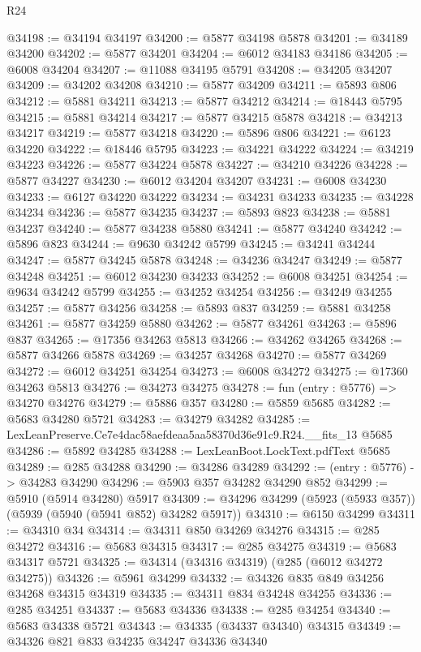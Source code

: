 \begin{lexlean}{R24}
\begin{coremodule}
@34198 := @34194 @34197
@34200 := @5877 @34198 @5878
@34201 := @34189 @34200
@34202 := @5877 @34201
@34204 := @6012 @34183 @34186
@34205 := @6008 @34204
@34207 := @11088 @34195 @5791
@34208 := @34205 @34207
@34209 := @34202 @34208
@34210 := @5877 @34209
@34211 := @5893 @806
@34212 := @5881 @34211
@34213 := @5877 @34212
@34214 := @18443 @5795
@34215 := @5881 @34214
@34217 := @5877 @34215 @5878
@34218 := @34213 @34217
@34219 := @5877 @34218
@34220 := @5896 @806
@34221 := @6123 @34220
@34222 := @18446 @5795
@34223 := @34221 @34222
@34224 := @34219 @34223
@34226 := @5877 @34224 @5878
@34227 := @34210 @34226
@34228 := @5877 @34227
@34230 := @6012 @34204 @34207
@34231 := @6008 @34230
@34233 := @6127 @34220 @34222
@34234 := @34231 @34233
@34235 := @34228 @34234
@34236 := @5877 @34235
@34237 := @5893 @823
@34238 := @5881 @34237
@34240 := @5877 @34238 @5880
@34241 := @5877 @34240
@34242 := @5896 @823
@34244 := @9630 @34242 @5799
@34245 := @34241 @34244
@34247 := @5877 @34245 @5878
@34248 := @34236 @34247
@34249 := @5877 @34248
@34251 := @6012 @34230 @34233
@34252 := @6008 @34251
@34254 := @9634 @34242 @5799
@34255 := @34252 @34254
@34256 := @34249 @34255
@34257 := @5877 @34256
@34258 := @5893 @837
@34259 := @5881 @34258
@34261 := @5877 @34259 @5880
@34262 := @5877 @34261
@34263 := @5896 @837
@34265 := @17356 @34263 @5813
@34266 := @34262 @34265
@34268 := @5877 @34266 @5878
@34269 := @34257 @34268
@34270 := @5877 @34269
@34272 := @6012 @34251 @34254
@34273 := @6008 @34272
@34275 := @17360 @34263 @5813
@34276 := @34273 @34275
@34278 := fun (entry : @5776) => @34270 @34276
@34279 := @5886 @357
@34280 := @5859 @5685
@34282 := @5683 @34280 @5721
@34283 := @34279 @34282
@34285 := LexLeanPreserve.Ce7e4dac58aefdeaa5aa58370d36e91c9.R24.__fits_13 @5685
@34286 := @5892 @34285
@34288 := LexLeanBoot.LockText.pdfText @5685
@34289 := @285 @34288
@34290 := @34286 @34289
@34292 := (entry : @5776) -> @34283 @34290
@34296 := @5903 @357 @34282 @34290 @852
@34299 := @5910 (@5914 @34280) @5917
@34309 := @34296 @34299 (@5923 (@5933 @357)) (@5939 (@5940 (@5941 @852) @34282 @5917))
@34310 := @6150 @34299
@34311 := @34310 @34
@34314 := @34311 @850 @34269 @34276
@34315 := @285 @34272
@34316 := @5683 @34315
@34317 := @285 @34275
@34319 := @5683 @34317 @5721
@34325 := @34314 (@34316 @34319) (@285 (@6012 @34272 @34275))
@34326 := @5961 @34299
@34332 := @34326 @835 @849 @34256 @34268 @34315 @34319
@34335 := @34311 @834 @34248 @34255
@34336 := @285 @34251
@34337 := @5683 @34336
@34338 := @285 @34254
@34340 := @5683 @34338 @5721
@34343 := @34335 (@34337 @34340) @34315
@34349 := @34326 @821 @833 @34235 @34247 @34336 @34340

\end{coremodule}
\end{lexlean}
